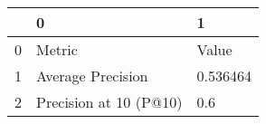 \begin{tabular}{lll}
\toprule
{} &                       0 &         1 \\
\midrule
0 &                  Metric &     Value \\
1 &       Average Precision &  0.536464 \\
2 &  Precision at 10 (P@10) &       0.6 \\
\bottomrule
\end{tabular}
